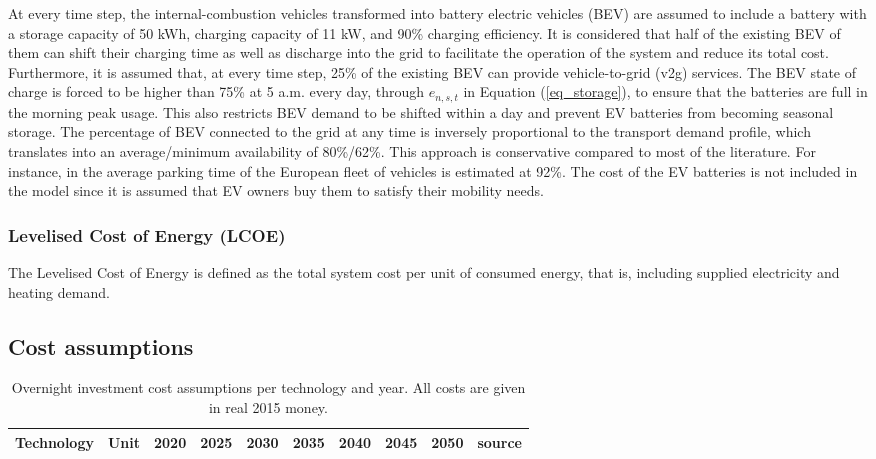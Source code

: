 \documentclass[3p]{elsarticle} %
\begin{document}
At every time step, the internal-combustion vehicles transformed into battery electric vehicles (BEV) are assumed to include a battery with a storage capacity of 50 kWh, charging capacity of 11 kW, and 90\% charging efficiency. It is considered that half of the existing BEV of them can shift their charging time as well as discharge into the grid to facilitate the operation of the system and reduce its total cost. Furthermore, it is assumed that, at every time step, 25\% of the existing BEV can provide vehicle-to-grid (v2g) services. The BEV state of charge is forced to be higher than 75\% at 5 a.m. every day, through $e_{n,s,t}$ in Equation (\ref{eq_storage}), to ensure that the batteries are full in the morning peak usage. This also restricts BEV demand to be shifted within a day and prevent EV batteries from becoming seasonal storage. The percentage of BEV connected to the grid at any time is inversely proportional to the transport demand profile, which translates into an average/minimum availability of 80\%/62\%. This approach is conservative compared to most of the literature. For instance, in \cite{circular_economy} the average parking time of the European fleet of vehicles is estimated at 92\%. The cost of the EV batteries is not included in the model since it is assumed that EV owners buy them to satisfy their mobility needs. 


\subsubsection{Levelised Cost of Energy (LCOE)}

The Levelised Cost of Energy is defined as the total system cost per unit of consumed energy, that is, including supplied electricity and heating demand. \\

\subsection{Cost assumptions}	

\begin{table}[!h]
\footnotesize
\centering
\begin{threeparttable}
\caption{Overnight investment cost assumptions per technology and year. All costs are given in real 2015 money. } \label{tab:cost per year}
\centering
\begin{tabularx}{18cm}{lccccccccr}
\toprule
Technology & Unit & 2020 & 2025 & 2030 & 2035 & 2040 & 2045 & 2050 & source\\
\midrule

\bottomrule
\end{tabularx}
\end{threeparttable}
\end{table}
\end{document}
